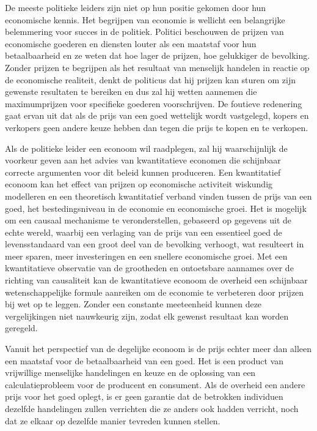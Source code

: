 De meeste politieke leiders zijn niet op hun positie gekomen door hun economische kennis. Het begrijpen van economie is wellicht een belangrijke belemmering voor succes in de politiek. Politici beschouwen de prijzen van economische goederen en diensten louter als een maatstaf voor hun betaalbaarheid en ze weten dat hoe lager de prijzen, hoe gelukkiger de bevolking. Zonder prijzen te begrijpen als het resultaat van menselijk handelen in reactie op de economische realiteit, denkt de politicus dat hij prijzen kan sturen om zijn gewenste resultaten te bereiken en dus zal hij wetten aannemen die maximumprijzen voor specifieke goederen voorschrijven. De foutieve redenering gaat ervan uit dat als de prijs van een goed wettelijk wordt vastgelegd, kopers en verkopers geen andere keuze hebben dan tegen die prijs te kopen en te verkopen.

Als de politieke leider een econoom wil raadplegen, zal hij waarschijnlijk de voorkeur geven aan het advies van kwantitatieve economen die schijnbaar correcte argumenten voor dit beleid kunnen produceren. Een kwantitatief econoom kan het effect van prijzen op economische activiteit wiskundig modelleren en een theoretisch kwantitatief verband vinden tussen de prijs van een goed, het bestedingsniveau in de economie en economische groei. Het is mogelijk om een causaal mechanisme te veronderstellen, gebaseerd op gegevens uit de echte wereld, waarbij een verlaging van de prijs van een essentieel goed de levensstandaard van een groot deel van de bevolking verhoogt, wat resulteert in meer sparen, meer investeringen en een snellere economische groei. Met een kwantitatieve observatie van de grootheden en ontoetsbare aannames over de richting van causaliteit kan de kwantitatieve econoom de overheid een schijnbaar wetenschappelijke formule aanreiken om de economie te verbeteren door prijzen bij wet op te leggen. Zonder een constante meeteenheid kunnen deze vergelijkingen niet nauwkeurig zijn, zodat elk gewenst resultaat kan worden geregeld.

Vanuit het perspectief van de degelijke econoom is de prijs echter meer dan alleen een maatstaf voor de betaalbaarheid van een goed. Het is een product van vrijwillige menselijke handelingen en keuze en de oplossing van een calculatieprobleem voor de producent en consument. Als de overheid een andere prijs voor het goed oplegt, is er geen garantie dat de betrokken individuen dezelfde handelingen zullen verrichten die ze anders ook hadden verricht, noch dat ze elkaar op dezelfde manier tevreden kunnen stellen.

